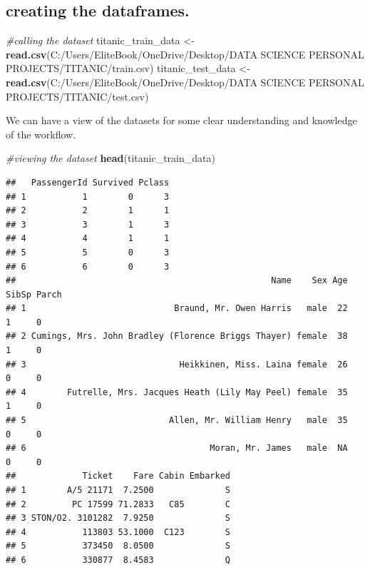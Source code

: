 \documentclass[
]{article}
\newenvironment{Shaded}{\begin{snugshade}}{\end{snugshade}}
\newcommand{\CommentTok}[1]{\textcolor[rgb]{0.56,0.35,0.01}{\textit{#1}}}
\newcommand{\FunctionTok}[1]{\textcolor[rgb]{0.13,0.29,0.53}{\textbf{#1}}}
\newcommand{\NormalTok}[1]{#1}
\newcommand{\OtherTok}[1]{\textcolor[rgb]{0.56,0.35,0.01}{#1}}
\newcommand{\StringTok}[1]{\textcolor[rgb]{0.31,0.60,0.02}{#1}}
\begin{document}
\hypertarget{creating-the-dataframes.}{%
\subsection{creating the dataframes.}\label{creating-the-dataframes.}}

\begin{Shaded}
\begin{Highlighting}[]
\CommentTok{\#calling the dataset}
\NormalTok{titanic\_train\_data }\OtherTok{\textless{}{-}} \FunctionTok{read.csv}\NormalTok{(}\StringTok{\textquotesingle{}C:/Users/EliteBook/OneDrive/Desktop/DATA SCIENCE PERSONAL PROJECTS/TITANIC/train.csv\textquotesingle{}}\NormalTok{)}
\NormalTok{titanic\_test\_data }\OtherTok{\textless{}{-}} \FunctionTok{read.csv}\NormalTok{(}\StringTok{\textquotesingle{}C:/Users/EliteBook/OneDrive/Desktop/DATA SCIENCE PERSONAL PROJECTS/TITANIC/test.csv\textquotesingle{}}\NormalTok{)}
\end{Highlighting}
\end{Shaded}

We can have a view of the datasets for some clear understanding and
knowledge of the workflow.

\begin{Shaded}
\begin{Highlighting}[]
\CommentTok{\#viewing the dataset}
\FunctionTok{head}\NormalTok{(titanic\_train\_data)}
\end{Highlighting}
\end{Shaded}

\begin{verbatim}
##   PassengerId Survived Pclass
## 1           1        0      3
## 2           2        1      1
## 3           3        1      3
## 4           4        1      1
## 5           5        0      3
## 6           6        0      3
##                                                  Name    Sex Age SibSp Parch
## 1                             Braund, Mr. Owen Harris   male  22     1     0
## 2 Cumings, Mrs. John Bradley (Florence Briggs Thayer) female  38     1     0
## 3                              Heikkinen, Miss. Laina female  26     0     0
## 4        Futrelle, Mrs. Jacques Heath (Lily May Peel) female  35     1     0
## 5                            Allen, Mr. William Henry   male  35     0     0
## 6                                    Moran, Mr. James   male  NA     0     0
##             Ticket    Fare Cabin Embarked
## 1        A/5 21171  7.2500              S
## 2         PC 17599 71.2833   C85        C
## 3 STON/O2. 3101282  7.9250              S
## 4           113803 53.1000  C123        S
## 5           373450  8.0500              S
## 6           330877  8.4583              Q
\end{verbatim}
\end{document}
